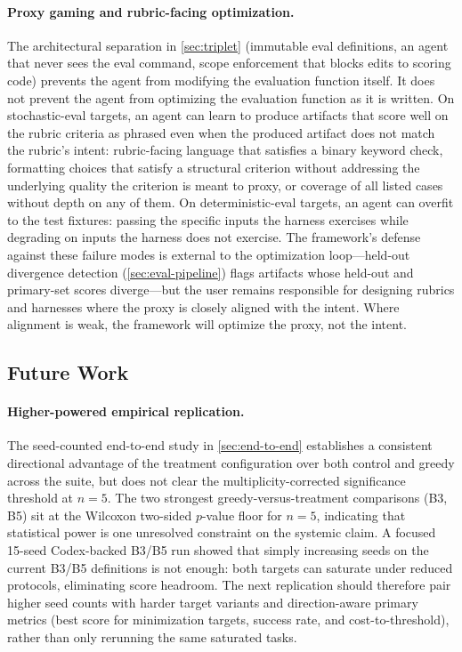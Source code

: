 \paragraph{Proxy gaming and rubric-facing optimization.}
The architectural separation in \cref{sec:triplet} (immutable eval definitions, an agent that never sees the eval command, scope enforcement that blocks edits to scoring code) prevents the agent from modifying the evaluation function itself.
It does not prevent the agent from optimizing the evaluation function as it is written.
On stochastic-eval targets, an agent can learn to produce artifacts that score well on the rubric criteria as phrased even when the produced artifact does not match the rubric's intent: rubric-facing language that satisfies a binary keyword check, formatting choices that satisfy a structural criterion without addressing the underlying quality the criterion is meant to proxy, or coverage of all listed cases without depth on any of them.
On deterministic-eval targets, an agent can overfit to the test fixtures: passing the specific inputs the harness exercises while degrading on inputs the harness does not exercise.
The framework's defense against these failure modes is external to the optimization loop---held-out divergence detection (\cref{sec:eval-pipeline}) flags artifacts whose held-out and primary-set scores diverge---but the user remains responsible for designing rubrics and harnesses where the proxy is closely aligned with the intent.
Where alignment is weak, the framework will optimize the proxy, not the intent.

\subsection{Future Work}
\label{sec:future-work}

\paragraph{Higher-powered empirical replication.}
The seed-counted end-to-end study in \cref{sec:end-to-end} establishes a consistent directional advantage of the treatment configuration over both control and greedy across the suite, but does not clear the multiplicity-corrected significance threshold at $n = 5$.
The two strongest greedy-versus-treatment comparisons (B3, B5) sit at the Wilcoxon two-sided $p$-value floor for $n = 5$, indicating that statistical power is one unresolved constraint on the systemic claim.
A focused 15-seed Codex-backed B3/B5 run showed that simply increasing seeds on the current B3/B5 definitions is not enough: both targets can saturate under reduced protocols, eliminating score headroom.
The next replication should therefore pair higher seed counts with harder target variants and direction-aware primary metrics (best score for minimization targets, success rate, and cost-to-threshold), rather than only rerunning the same saturated tasks.

